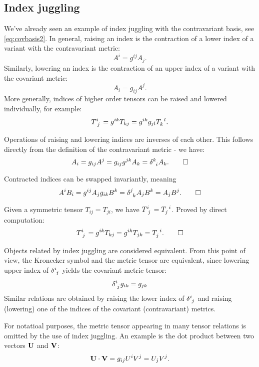 \documentclass{article}
\begin{document}
	\subsection{Index juggling}
	We've already seen an example of index juggling with the contravariant basis, see \eqref{eq:covbasis2}. In general, raising an index is the contraction of a lower index of a variant with the contravariant metric:
	\begin{equation}
		A^{i} = g^{ij} A_j.
	\end{equation}
	Similarly, lowering an index is the contraction of an upper index of a variant with the covariant metric:
	\begin{equation}
		A_{i} = g_{ij} A^{j}.
	\end{equation}
	More generally, indices of higher order tensors can be raised and lowered individually, for example:
	\begin{equation}
		T\indices{^{i}_{j}} = g^{ik}T_{kj} = g^{ik} g_{jl} T\indices{_k^{l}}.
	\end{equation}
	\begin{proposition}
		Operations of raising and lowering indices are inverses of each other. This follows directly from the definition of the contravariant metric - we have:
		\[
		A_{i} = g_{ij} A^{j} = g_{ij} g^{jk} A_{k} = \delta\indices{^{k}_{i}} A_{k}. \qed
		\]
	\end{proposition}
	\begin{proposition}
		Contracted indices can be swapped invariantly, meaning
		\[
		A^{i} B_{i} = g^{ij} A_{j} g_{ik} B^{k} = \delta\indices{^{j}_{k}} A_{j} B^{k} = A_{j} B^{j}. \qed
		\]
	\end{proposition}
	\begin{proposition}
		Given a symmetric tensor $ T_{ij} = T_{ji} $, we have $ T\indices{^{i}_{j}} = T\indices{_{j}^{i}} $. Proved by direct computation:
		\[
		T\indices{^{i}_{j}} = g^{ik} T_{kj} = g^{ik} T_{jk} = T\indices{_{j}^{i}}. \qed
		\]
	\end{proposition}
	\begin{corollary}
		Objects related by index juggling are considered equivalent. From this point of view, the Kronecker symbol and the metric tensor are equivalent, since lowering upper index of $ \delta\indices{^{i}_{j}} $ yields the covariant metric tensor:
		\[
		\delta\indices{^{i}_{j}} g_{ik} = g_{jk}
		\]
		Similar relations are obtained by raising the lower index of $ \delta\indices{^{i}_{j}} $ and raising (lowering) one of the indices of the covariant (contravariant) metrics.
	\end{corollary}
	\par
	For notatioal purposes, the metric tensor appearing in many tensor relations is omitted by the use of index juggling. An example is the dot product between two vectors $ \vb{U} $ and $ \vb{V} $:
	\[
	\vb{U} \cdot \vb{V} = g_{ij} U^{i} V^{j} = U_{j} V^{j}.
	\]
	\newpage
\end{document}
